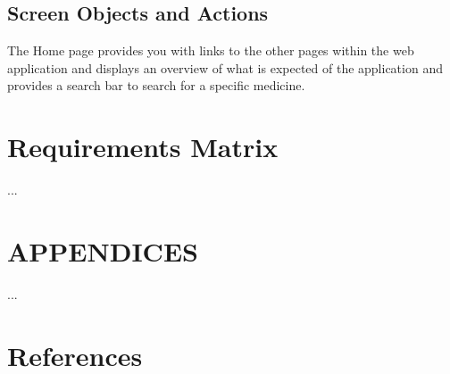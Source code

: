 \documentclass[]{article}
\begin{document}
\subsection {Screen Objects and Actions}
The Home page provides you with links to the other pages within the web application and displays an overview of what is expected of the application and provides a search bar to search for a specific medicine.


\section{Requirements Matrix}
...


\section{APPENDICES}
...

\section {References}



\end{document}
